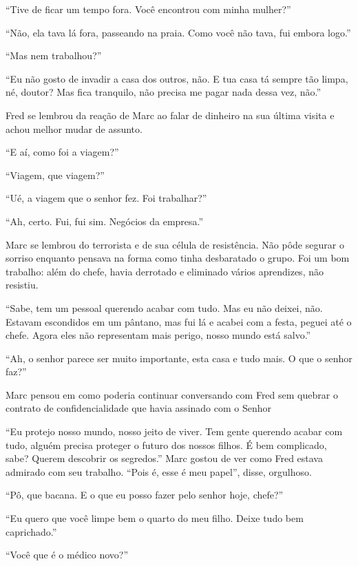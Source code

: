 ``Tive de ficar um tempo fora. Você encontrou com minha mulher?''

``Não, ela tava lá fora, passeando na praia. Como você não tava, fui
embora logo.''

``Mas nem trabalhou?''

``Eu não gosto de invadir a casa dos outros, não. E tua casa tá sempre
tão limpa, né, doutor? Mas fica tranquilo, não precisa me pagar nada
dessa vez, não.''

Fred se lembrou da reação de Marc ao falar de dinheiro na sua última
visita e achou melhor mudar de assunto.

``E aí, como foi a viagem?''

``Viagem, que viagem?''

``Ué, a viagem que o senhor fez. Foi trabalhar?''

``Ah, certo. Fui, fui sim. Negócios da empresa.''

Marc se lembrou do terrorista e de sua célula de resistência.
Não pôde segurar o sorriso enquanto pensava na forma como tinha
desbaratado o grupo. Foi um bom trabalho: além do chefe, havia derrotado
e eliminado vários aprendizes, não resistiu.

``Sabe, tem um pessoal querendo acabar com tudo. Mas eu não deixei, não.
Estavam escondidos em um pântano, mas fui lá e acabei com a festa,
peguei até o chefe. Agora eles não representam mais perigo, nosso mundo
está salvo.''

``Ah, o senhor parece ser muito importante, esta casa e tudo mais. O que
o senhor faz?''

Marc pensou em como poderia continuar conversando com Fred sem quebrar o
contrato de confidencialidade que havia assinado com o Senhor 

``Eu protejo nosso mundo, nosso jeito de viver. Tem gente querendo
acabar com tudo, alguém precisa proteger o futuro dos nossos filhos. É
bem complicado, sabe? Querem descobrir os segredos.'' Marc gostou de ver
como Fred estava admirado com seu trabalho. ``Pois é, esse é meu
papel'', disse, orgulhoso.

``Pô, que bacana. E o que eu posso fazer pelo senhor hoje, chefe?''

``Eu quero que você limpe bem o quarto do meu filho. Deixe tudo bem
caprichado.''

\asterisc


``Você que é o médico novo?''

